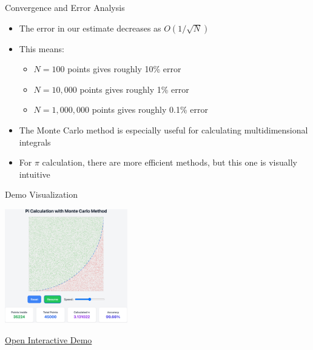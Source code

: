 \begin{frame}{Convergence and Error Analysis}
  \begin{itemize}
    \item The error in our estimate decreases as $O(1/\sqrt{N})$
    \item This means:
          \begin{itemize}
            \item $N=100$ points gives roughly 10\% error
            \item $N=10,000$ points gives roughly 1\% error
            \item $N=1,000,000$ points gives roughly 0.1\% error
          \end{itemize}
    \item The Monte Carlo method is especially useful for calculating multidimensional integrals
    \item For $\pi$ calculation, there are more efficient methods, but this one is visually intuitive
  \end{itemize}
\end{frame}

\begin{frame}{Demo Visualization}
\begin{center}
\includegraphics[width=0.4\textwidth]{../programs/pi_calculation/pi_calculation.png}

    \vspace{0.5cm}
    \href{../programs/pi_calculation/pi_calculation.html}{Open Interactive Demo}
    \end{center}
\end{frame}